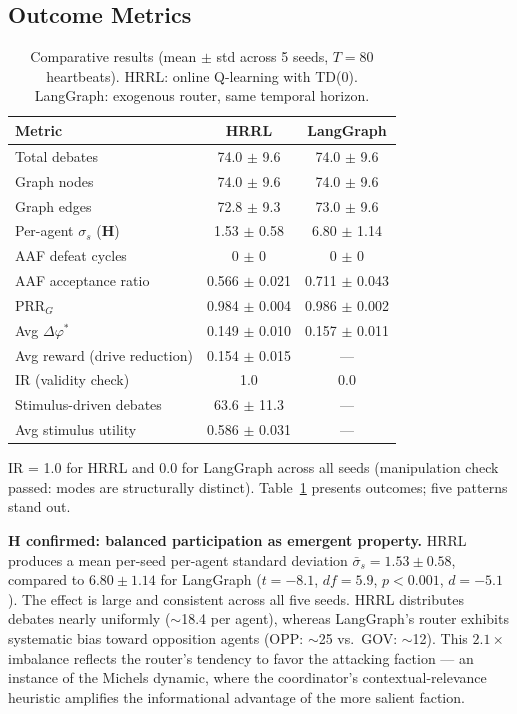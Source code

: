 \documentclass{llncs}
\begin{document}
\subsection{Outcome Metrics}

\begin{table}
\caption{Comparative results (mean $\pm$ std across 5 seeds, $T=80$
heartbeats). HRRL: online Q-learning with TD(0). LangGraph: exogenous
router, same temporal horizon.}\label{tab:results}
\begin{tabular}{|l|c|c|}
\hline
\textbf{Metric} & \textbf{HRRL} & \textbf{LangGraph} \\
\hline
Total debates              & 74.0 $\pm$ 9.6  & 74.0 $\pm$ 9.6 \\
Graph nodes                & 74.0 $\pm$ 9.6  & 74.0 $\pm$ 9.6 \\
Graph edges                & 72.8 $\pm$ 9.3  & 73.0 $\pm$ 9.6 \\
\hline
Per-agent $\sigma_s$ (\textbf{H}) & 1.53 $\pm$ 0.58 & 6.80 $\pm$ 1.14 \\
\hline
AAF defeat cycles          & 0 $\pm$ 0 & 0 $\pm$ 0 \\
AAF acceptance ratio       & 0.566 $\pm$ 0.021 & 0.711 $\pm$ 0.043 \\
PRR$_G$                    & 0.984 $\pm$ 0.004 & 0.986 $\pm$ 0.002 \\
Avg $\Delta\varphi^*$      & 0.149 $\pm$ 0.010 & 0.157 $\pm$ 0.011 \\
Avg reward (drive reduction) & 0.154 $\pm$ 0.015 & --- \\
\hline
IR (validity check)        & 1.0 & 0.0 \\
Stimulus-driven debates    & 63.6 $\pm$ 11.3 & --- \\
Avg stimulus utility       & 0.586 $\pm$ 0.031 & --- \\
\hline
\end{tabular}
\end{table}

IR = 1.0 for HRRL and 0.0 for LangGraph across all seeds (manipulation
check passed: modes are structurally distinct). Table~\ref{tab:results}
presents outcomes; five patterns stand out.

\textbf{H confirmed: balanced participation as emergent property.} HRRL
produces a mean per-seed per-agent standard deviation $\bar{\sigma}_s =
1.53 \pm 0.58$, compared to $6.80 \pm 1.14$ for LangGraph ($t = -8.1$,
$df = 5.9$, $p < 0.001$, $d = -5.1$). The effect is large and consistent
across all five seeds. HRRL distributes debates nearly uniformly
($\sim$18.4 per agent), whereas LangGraph's router exhibits systematic
bias toward opposition agents (OPP: $\sim$25 vs.\ GOV: $\sim$12). This
$2.1\times$ imbalance reflects the router's tendency to favor the
attacking faction --- an instance of the Michels dynamic, where the
coordinator's contextual-relevance heuristic amplifies the informational
advantage of the more salient faction.
\end{document}
